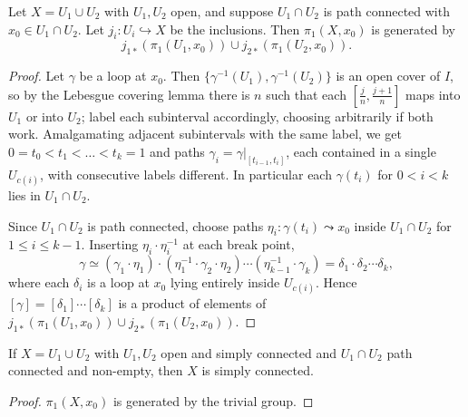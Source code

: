 \begin{theorem} \label{thm:vk-generation}
	Let $X = U_1 \cup U_2$ with $U_1, U_2$ open, and suppose $U_1 \cap U_2$ is path connected with $x_0 \in U_1 \cap U_2$. Let $j_i: U_i \hookrightarrow X$ be the inclusions. Then $\pi_1(X, x_0)$ is generated by
	$$
	j_{1*}(\pi_1(U_1,x_0)) \cup j_{2*}(\pi_1(U_2,x_0)).
	$$
\end{theorem}
\begin{proof}
	Let $\gamma$ be a loop at $x_0$. Then $\{\gamma^{-1}(U_1), \gamma^{-1}(U_2)\}$ is an open cover of $I$, so by the Lebesgue covering lemma there is $n$ such that each $[\frac{j}{n},\frac{j+1}{n}]$ maps into $U_1$ or into $U_2$; label each subinterval accordingly, choosing arbitrarily if both work. Amalgamating adjacent subintervals with the same label, we get $0 = t_0 < t_1 < \dots < t_k = 1$ and paths $\gamma_i = \gamma|_{[t_{i-1},t_i]}$, each contained in a single $U_{c(i)}$, with consecutive labels different. In particular each $\gamma(t_i)$ for $0 < i < k$ lies in $U_1 \cap U_2$.

	Since $U_1 \cap U_2$ is path connected, choose paths $\eta_i: \gamma(t_i) \leadsto x_0$ inside $U_1 \cap U_2$ for $1 \leq i \leq k-1$. Inserting $\eta_i \cdot \eta_i^{-1}$ at each break point,
	$$
	\gamma \simeq (\gamma_1\cdot\eta_1)\cdot(\eta_1^{-1}\cdot\gamma_2\cdot\eta_2)\cdots(\eta_{k-1}^{-1}\cdot\gamma_k) = \delta_1 \cdot \delta_2 \cdots \delta_k,
	$$
	where each $\delta_i$ is a loop at $x_0$ lying entirely inside $U_{c(i)}$. Hence $[\gamma] = [\delta_1]\cdots[\delta_k]$ is a product of elements of $j_{1*}(\pi_1(U_1,x_0)) \cup j_{2*}(\pi_1(U_2,x_0))$.
\end{proof}

\begin{center}
\end{center}

\begin{corollary} \label{cor:sphere-sc}
	If $X = U_1 \cup U_2$ with $U_1, U_2$ open and simply connected and $U_1 \cap U_2$ path connected and non-empty, then $X$ is simply connected.
\end{corollary}
\begin{proof}
	$\pi_1(X, x_0)$ is generated by the trivial group.
\end{proof}

